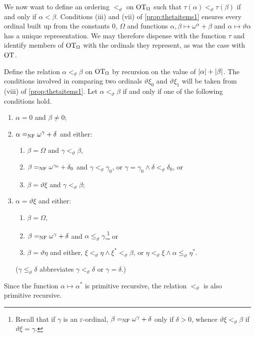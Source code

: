 \documentclass[UKenglish,cleveref,DIV=12]{scrartcl}
\newtheorem{lemma}[theorem]{Lemma}%
\theoremstyle{definition}
\theoremstyle{definition}
\begin{document}
We now want to define an ordering $<_\vartheta$ on $\mathrm{OT}_\Omega$ such that
$\tau(\alpha)<_\vartheta\tau(\beta)$ if and only if $\alpha<\beta$. Conditions
(iii) and (vii) of \cref{prop:thetaitems1} ensures every ordinal built up
from the constants $0$, $\Omega$ and functions
$\alpha,\beta\mapsto\omega^\alpha+\beta$ and $\alpha\mapsto\vartheta\alpha$ has
a unique representation. We may therefore dispense with the
function $\tau$ and identify members of $\mathrm{OT}_\Omega$ with the ordinals they
represent, as was the case with $\mathrm{OT}$.

Define the relation $\alpha<_\vartheta\beta$ on $\mathrm{OT}_\Omega$ by
recursion on the value of $\lvert{\alpha}\rvert+\lvert{\beta}\rvert$. The conditions involved in
comparing two ordinals $\vartheta\xi_0$ and $\vartheta\xi_1$ will be taken from
(viii) of \cref{prop:thetaitems1}. Let $\alpha<_\vartheta\beta$ if and only
if one of the following conditions hold.
\begin{enumerate}
 \item $\alpha=0$ and $\beta\neq0$;
 \item $\alpha =_{\mathrm{NF}}\omega^\gamma+\delta$ and either:
 \begin{enumerate}
  \item $\beta=\Omega$ and $\gamma<_\vartheta\beta$,
  \item $\beta=_{\mathrm{NF}}\omega^{\gamma_0}+\delta_0$ and $\gamma<_\vartheta\gamma_0$, or $\gamma=\gamma_0\land\delta<_\vartheta\delta_0$, or
  \item $\beta=\vartheta\xi$ and $\gamma<_\vartheta\beta$;
 \end{enumerate}
 \item $\alpha=\vartheta\xi$ and either:
 \begin{enumerate}
  \item $\beta=\Omega$,
  \item $\beta=_{\mathrm{NF}}\omega^{\gamma}+\delta$ and $\alpha\le_\vartheta\gamma$,\footnote{Recall that if $\gamma$ is an $\varepsilon$-ordinal, $\beta=_{\mathrm{NF}}\omega^\gamma+\delta$ only if $\delta>0$, whence $\vartheta\xi<_\vartheta\beta$ if $\vartheta\xi=\gamma$.} or
  \item $\beta=\vartheta\eta$ and either, $\xi<_\vartheta\eta\land \xi^*<_\vartheta\beta$, or $\eta<_\vartheta\xi\land\alpha\le_\vartheta\eta^*$.
 \end{enumerate}
($\gamma\le_\vartheta\delta$ abbreviates $\gamma<_\vartheta\delta$ or $\gamma=\delta$.)
\end{enumerate}
Since the function $\alpha\mapsto\alpha^*$ is primitive recursive, the relation $<_\vartheta$ is also primitive recursive.
\end{document}
